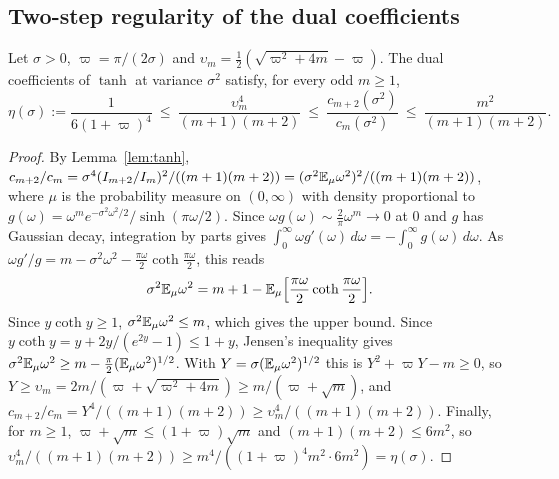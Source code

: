 \subsection{Two-step regularity of the dual coefficients}\label{sec:twostep}
\begin{lemma}\label{lem:twostep}
Let $\sigma>0$, $\varpi=\pi/(2\sigma)$ and
$\upsilon_m=\frac12(\sqrt{\varpi^2+4m}-\varpi)$. The dual coefficients of
$\tanh$ at variance $\sigma^2$ satisfy, for every odd $m\ge1$,
\[
 \eta(\sigma):=\frac1{6(1+\varpi)^4}\ \le\ \frac{\upsilon_m^4}{(m+1)(m+2)}
 \ \le\ \frac{c_{m+2}(\sigma^2)}{c_m(\sigma^2)}\ \le\ \frac{m^2}{(m+1)(m+2)} .
\]
\end{lemma}
\begin{proof}
By Lemma~\ref{lem:tanh},
$c_{m+2}/c_m=\sigma^4(I_{m+2}/I_m)^2/((m+1)(m+2))
=(\sigma^2\mathbb E_\mu\omega^2)^2/((m+1)(m+2))$, where $\mu$ is the probability
measure on $(0,\infty)$ with density proportional to
$g(\omega)=\omega^me^{-\sigma^2\omega^2/2}/\sinh(\pi\omega/2)$. Since
$\omega g(\omega)\sim\frac2\pi\omega^m\to0$ at $0$ and $g$ has Gaussian
decay, integration by parts gives $\int_0^\infty\omega g'(\omega)\,d\omega
=-\int_0^\infty g(\omega)\,d\omega$. As
$\omega g'/g=m-\sigma^2\omega^2-\frac{\pi\omega}2\coth\frac{\pi\omega}2$,
this reads
\[
 \sigma^2\mathbb E_\mu\omega^2=m+1-\mathbb E_\mu\Bigl[\frac{\pi\omega}2
 \coth\frac{\pi\omega}2\Bigr].
\]
Since $y\coth y\ge1$, $\sigma^2\mathbb E_\mu\omega^2\le m$, which gives the upper
bound. Since $y\coth y=y+2y/(e^{2y}-1)\le1+y$, Jensen's inequality gives
$\sigma^2\mathbb E_\mu\omega^2\ge m-\frac\pi2(\mathbb E_\mu\omega^2)^{1/2}$. With
$Y=\sigma(\mathbb E_\mu\omega^2)^{1/2}$ this is $Y^2+\varpi Y-m\ge0$, so
$Y\ge\upsilon_m=2m/(\varpi+\sqrt{\varpi^2+4m})\ge m/(\varpi+\sqrt m)$, and
$c_{m+2}/c_m=Y^4/((m+1)(m+2))\ge\upsilon_m^4/((m+1)(m+2))$. Finally, for
$m\ge1$, $\varpi+\sqrt m\le(1+\varpi)\sqrt m$ and $(m+1)(m+2)\le6m^2$, so
$\upsilon_m^4/((m+1)(m+2))\ge m^4/((1+\varpi)^4m^2\cdot6m^2)=\eta(\sigma)$.
\end{proof}

